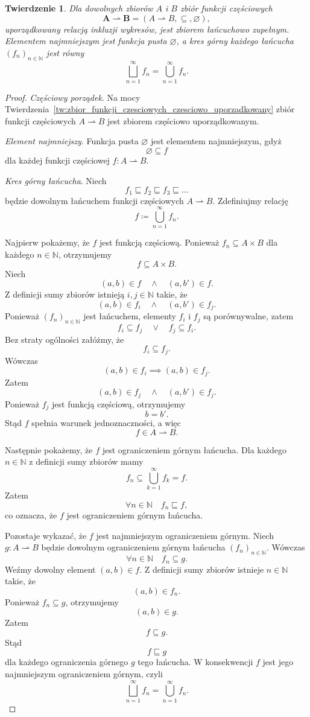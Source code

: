\documentclass[11pt,a4paper]{article}
\theoremstyle{definition}
\theoremstyle{plain}
\newtheorem{twierdzenie}[definicja]{Twierdzenie}
\begin{document}
\begin{twierdzenie}\label{tw:funkcje_czesciowe_cpo}
	Dla dowolnych zbiorów $A$ i $B$ zbiór funkcji częściowych
	\[
	\boldsymbol{A\rightharpoonup B} = (A \rightharpoonup B, \subseteq, \varnothing),
	\]
	uporządkowany relacją inkluzji wykresów, jest zbiorem łańcuchowo
	zupełnym. Elementem najmniejszym jest funkcja pusta $\varnothing$,
	a kres górny każdego łańcucha $(f_n)_{n\in\mathbb{N}}$ jest równy
	\[
	\bigsqcup_{n=1}^{\infty} f_n
	=
	\bigcup_{n=1}^{\infty} f_n.
	\]
\end{twierdzenie}

\begin{proof}
	\emph{Częściowy porządek}. Na mocy Twierdzenia~\ref{tw:zbior_funkcji_czesciowych_czesciowo_uporzadkowany} zbiór funkcji częściowych $A \rightharpoonup B$ jest zbiorem częściowo uporządkowanym. 
	
	\emph{Element najmniejszy}. Funkcja pusta $\varnothing$ jest elementem najmniejszym, gdyż
	\[
	\varnothing\subseteq f
	\]
	dla każdej funkcji częściowej $f:A\rightharpoonup B$.
	
	\emph{Kres górny łańcucha}. Niech
	\[
	f_1\sqsubseteq f_2\sqsubseteq f_3\sqsubseteq\ldots
	\]
	będzie dowolnym łańcuchem funkcji częściowych $A\rightharpoonup B$.
	Zdefiniujmy relację
	\[
	f\coloneqq \bigcup_{n=1}^{\infty}f_n.
	\]
	
	Najpierw pokażemy, że $f$ jest funkcją częściową. Ponieważ
	$f_n\subseteq A\times B$ dla każdego $n\in\mathbb{N}$, otrzymujemy
	\[
	f\subseteq A\times B.
	\]
	Niech
	\[
	(a,b)\in f
	\quad\land\quad
	(a,b')\in f.
	\]
	Z definicji sumy zbiorów istnieją $i,j\in\mathbb{N}$ takie, że
	\[
	(a,b)\in f_i
	\quad\land\quad
	(a,b')\in f_j.
	\]
	Ponieważ $(f_n)_{n\in\mathbb{N}}$ jest łańcuchem, elementy $f_i$
	i $f_j$ są porównywalne, zatem
	\[
	f_i\subseteq f_j
	\quad\lor\quad
	f_j\subseteq f_i.
	\]
	Bez straty ogólności załóżmy, że
	\[
	f_i\subseteq f_j.
	\]
	Wówczas
	\[
	(a,b)\in f_i
	\implies
	(a,b)\in f_j.
	\]
	Zatem
	\[
	(a,b)\in f_j
	\quad\land\quad
	(a,b')\in f_j.
	\]
	Ponieważ $f_j$ jest funkcją częściową, otrzymujemy
	\[
	b=b'.
	\]
	Stąd $f$ spełnia warunek jednoznaczności, a więc
	\[
	f\in A\rightharpoonup B.
	\]
	
	Następnie pokażemy, że $f$ jest ograniczeniem górnym łańcucha.
	Dla każdego $n\in\mathbb{N}$ z definicji sumy zbiorów mamy
	\[
	f_n\subseteq\bigcup_{k=1}^{\infty}f_k=f.
	\]
	Zatem
	\[
	\forall n\in\mathbb{N}\quad f_n\sqsubseteq f,
	\]
	co oznacza, że $f$ jest ograniczeniem górnym łańcucha.
	
	Pozostaje wykazać, że $f$ jest najmniejszym ograniczeniem górnym.
	Niech $g:A\rightharpoonup B$ będzie dowolnym ograniczeniem górnym
	łańcucha $(f_n)_{n\in\mathbb{N}}$. Wówczas
	\[
	\forall n\in\mathbb{N}\quad f_n\subseteq g.
	\]
	Weźmy dowolny element $(a,b)\in f$. Z definicji sumy zbiorów
	istnieje $n\in\mathbb{N}$ takie, że
	\[
	(a,b)\in f_n.
	\]
	Ponieważ $f_n\subseteq g$, otrzymujemy
	\[
	(a,b)\in g.
	\]
	Zatem
	\[
	f\subseteq g.
	\]
	Stąd
	\[
	f\sqsubseteq g
	\]
	dla każdego ograniczenia górnego $g$ tego łańcucha. W konsekwencji
	$f$ jest jego najmniejszym ograniczeniem górnym, czyli
	\[
	\bigsqcup_{n=1}^{\infty}f_n
	=
	\bigcup_{n=1}^{\infty}f_n.
	\]
	

\end{proof}
\end{document}
